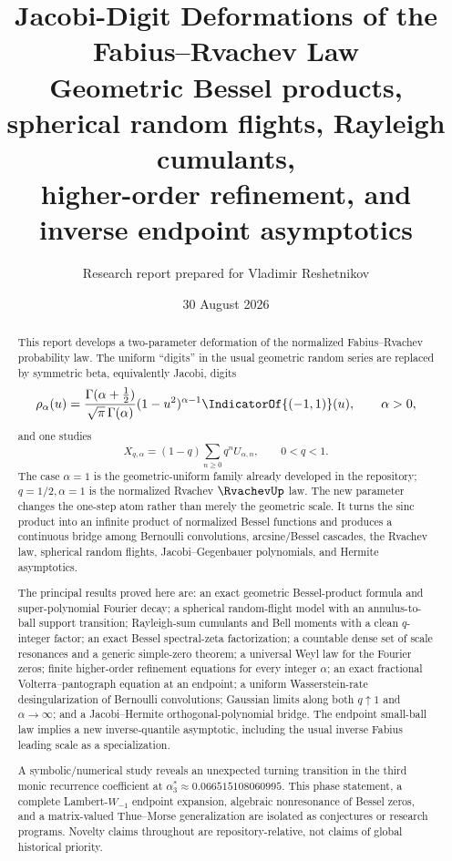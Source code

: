 \documentclass[11pt]{article}
\title{\textbf{Jacobi-Digit Deformations of the Fabius--Rvachev Law}\\[0.35em]
\large Geometric Bessel products, spherical random flights, Rayleigh cumulants,\\
higher-order refinement, and inverse endpoint asymptotics}
\author{Research report prepared for Vladimir Reshetnikov}
\date{30 August 2026}
\theoremstyle{definition}
\theoremstyle{remark}
\begin{document}
\maketitle

\begin{abstract}
This report develops a two-parameter deformation of the normalized
Fabius--Rvachev probability law.  The uniform ``digits'' in the usual
geometric random series are replaced by symmetric beta, equivalently Jacobi,
digits
\[
 \rho_\alpha(u)=
 \frac{\Gamma(\alpha+\tfrac12)}{\sqrt\pi\,\Gamma(\alpha)}
 (1-u^2)^{\alpha-1}\IndicatorOf{(-1,1)}(u),
 \qquad \alpha>0,
\]
and one studies
\[
 X_{q,\alpha}=(1-q)\sum_{n\ge0}q^nU_{\alpha,n},\qquad 0<q<1.
\]
The case \(\alpha=1\) is the geometric-uniform family already developed in
the repository; \(q=1/2,\alpha=1\) is the normalized Rvachev \(\RvachevUp\) law.
The new parameter changes the one-step atom rather than merely the geometric
scale.  It turns the sinc product into an infinite product of normalized
Bessel functions and produces a continuous bridge among Bernoulli
convolutions, arcsine/Bessel cascades, the Rvachev law, spherical random
flights, Jacobi--Gegenbauer polynomials, and Hermite asymptotics.

The principal results proved here are: an exact geometric Bessel-product
formula and super-polynomial Fourier decay; a spherical random-flight model
with an annulus-to-ball support transition; Rayleigh-sum cumulants and Bell
moments with a clean \(q\)-integer factor; an exact Bessel spectral-zeta
factorization; a countable dense set of scale resonances and a generic
simple-zero theorem; a universal Weyl law for the Fourier zeros; finite
higher-order refinement equations for every integer \(\alpha\); an exact
fractional Volterra--pantograph equation at an endpoint; a uniform
Wasserstein-rate desingularization of Bernoulli convolutions; Gaussian limits
along both \(q\uparrow1\) and \(\alpha\to\infty\); and a
Jacobi--Hermite orthogonal-polynomial bridge.  The endpoint small-ball law
implies a new inverse-quantile asymptotic, including the usual inverse Fabius
leading scale as a specialization.

A symbolic/numerical study reveals an unexpected turning transition in the
third monic recurrence coefficient at
\(\alpha_3^*\approx0.066515108060995\).  This phase statement, a complete
Lambert-\(W_{-1}\) endpoint expansion, algebraic nonresonance of Bessel zeros,
and a matrix-valued Thue--Morse generalization are isolated as conjectures or
research programs.  Novelty claims throughout are repository-relative, not
claims of global historical priority.
\end{abstract}
\end{document}
